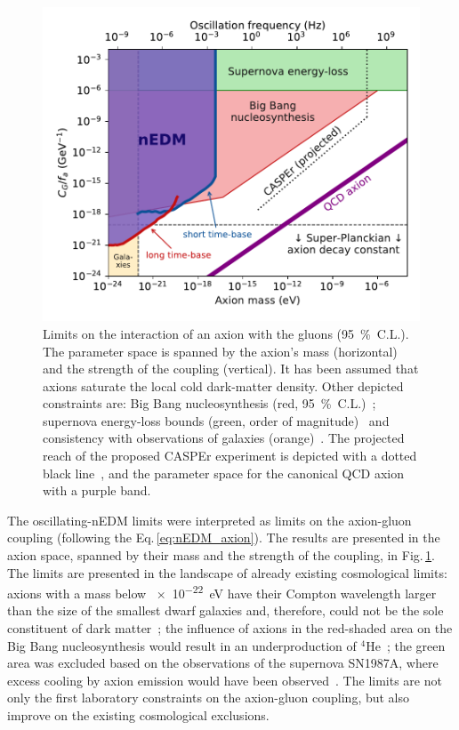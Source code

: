 \begin{figure}
  \centering
  \includegraphics[width=\linewidth]{gfx/axions/psi_ill_axion_limits_v7.pdf}
  \caption{Limits on the interaction of an axion with the gluons (\SI{95}{\percent}~C.L.).
  The parameter space is spanned by the axion's mass (horizontal) and the strength of the coupling (vertical).
  It has been assumed that axions saturate the local cold dark-matter density.
  Other depicted constraints are: Big Bang nucleosynthesis (red, \SI{95}{\percent}~C.L.)~\cite{Blum2014,StadnikThesis,Stadnik2015D}; supernova energy-loss bounds (green, order of magnitude)~\cite{Graham2013,Raffelt1990Review,Raffelt2008LNP} and consistency with observations of galaxies (orange)~\cite{Marsh2015Review,Marsh2015B,Schive2015,Marsh2017}.
  The projected reach of the proposed CASPEr experiment is depicted with a dotted black line~\cite{CASPEr2014}, and the parameter space for the canonical QCD axion with a purple band.}
\label{fig:axions_limits_coupling}
\end{figure}

The oscillating-nEDM limits were interpreted as limits on the axion-gluon coupling (following the Eq.\,\ref{eq:nEDM_axion}).
The results are presented in the axion space, spanned by their mass and the strength of the coupling, in Fig.\,\ref{fig:axions_limits_coupling}.
The limits are presented in the landscape of already existing cosmological limits: axions with a mass below \SI{e-22}{\electronvolt} have their Compton wavelength larger than the size of the smallest dwarf galaxies and, therefore, could not be the sole constituent of dark matter~\cite{Marsh2015Review}; the influence of axions in the red-shaded area on the Big Bang nucleosynthesis would result in an underproduction of ${}^4$He~\cite{Blum2014}; the green area was excluded based on the observations of the supernova SN1987A, where excess cooling by axion emission would have been observed~\cite{Graham2013}.
The limits are not only the first laboratory constraints on the axion-gluon coupling, but also improve on the existing cosmological exclusions.




